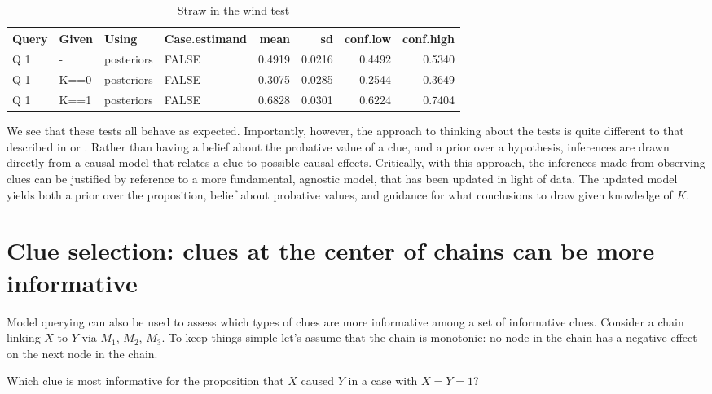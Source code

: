 \documentclass[
  12pt,
]{book}
\begin{document}
\begin{table}

\caption{\label{tab:unnamed-chunk-92}Straw in the wind test}
\centering
\begin{tabular}[t]{l|l|l|l|r|r|r|r}
\hline
Query & Given & Using & Case.estimand & mean & sd & conf.low & conf.high\\
\hline
Q 1 & - & posteriors & FALSE & 0.4919 & 0.0216 & 0.4492 & 0.5340\\
\hline
Q 1 & K==0 & posteriors & FALSE & 0.3075 & 0.0285 & 0.2544 & 0.3649\\
\hline
Q 1 & K==1 & posteriors & FALSE & 0.6828 & 0.0301 & 0.6224 & 0.7404\\
\hline
\end{tabular}
\end{table}

We see that these tests all behave as expected. Importantly, however, the approach to thinking about the tests is quite different to that described in \citet{collier2011understanding} or \citet{humphreys2015mixing}. Rather than having a belief about the probative value of a clue, and a prior over a hypothesis, inferences are drawn directly from a causal model that relates a clue to possible causal effects. Critically, with this approach, the inferences made from observing clues can be justified by reference to a more fundamental, agnostic model, that has been updated in light of data. The updated model yields both a prior over the proposition, belief about probative values, and guidance for what conclusions to draw given knowledge of \(K\).

\hypertarget{clue-selection-clues-at-the-center-of-chains-can-be-more-informative}{%
\section{Clue selection: clues at the center of chains can be more informative}\label{clue-selection-clues-at-the-center-of-chains-can-be-more-informative}}

Model querying can also be used to assess which types of clues are more informative among a set of informative clues. Consider a chain linking \(X\) to \(Y\) via \(M_1\), \(M_2\), \(M_3\). To keep things simple let's assume that the chain is monotonic: no node in the chain has a negative effect on the next node in the chain.

Which clue is most informative for the proposition that \(X\) caused \(Y\) in a case with \(X=Y=1\)?
\end{document}
